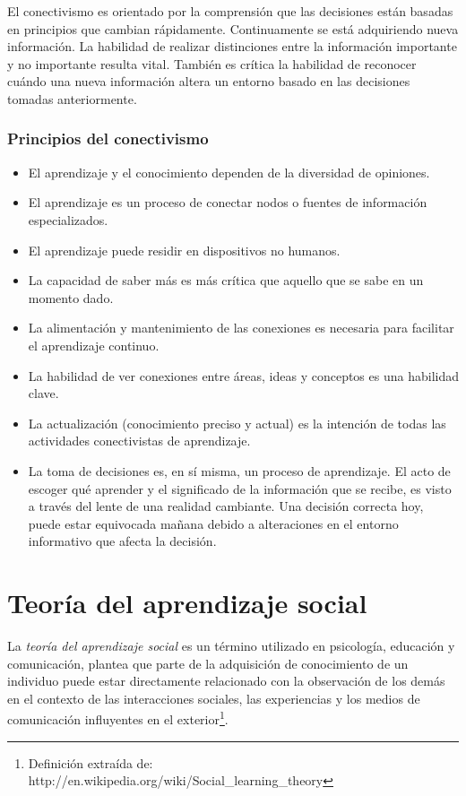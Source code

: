 El conectivismo es orientado por la comprensión que las decisiones están basadas
en principios que cambian rápidamente. Continuamente se está adquiriendo nueva
información. La habilidad de realizar distinciones entre la información
importante y no importante resulta vital. También es crítica la habilidad de
reconocer cuándo una nueva información altera un entorno basado en las
decisiones tomadas anteriormente.

\subsubsection{Principios del conectivismo}

\begin{itemize}
\item El aprendizaje y el conocimiento dependen de la diversidad de opiniones.
\item El aprendizaje es un proceso de conectar nodos o fuentes de información
especializados.
\item El aprendizaje puede residir en dispositivos no humanos.
\item La capacidad de saber más es más crítica que aquello que se sabe en un
momento dado.
\item La alimentación y mantenimiento de las conexiones es necesaria para
facilitar el aprendizaje continuo.
\item La habilidad de ver conexiones entre áreas, ideas y conceptos es una
habilidad clave.
\item La actualización (conocimiento preciso y actual) es la intención de todas
las actividades conectivistas de aprendizaje.
\item La toma de decisiones es, en sí misma, un proceso de aprendizaje. El acto
de escoger qué aprender y el significado de la información que se recibe, es
visto a través del lente de una realidad cambiante. Una decisión correcta hoy,
puede estar equivocada mañana debido a alteraciones en el entorno informativo
que afecta la decisión. 
\end{itemize}

\section{Teoría del aprendizaje social}

La \emph{teoría del aprendizaje social} es un término utilizado en psicología,
educación y comunicación, plantea que parte de la adquisición de conocimiento
de un individuo puede estar directamente relacionado con la observación de los
demás en el contexto de las interacciones sociales, las experiencias y los
medios de comunicación influyentes en el exterior\footnote{Definición extraída
de: http://en.wikipedia.org/wiki/Social\_learning\_theory}.

